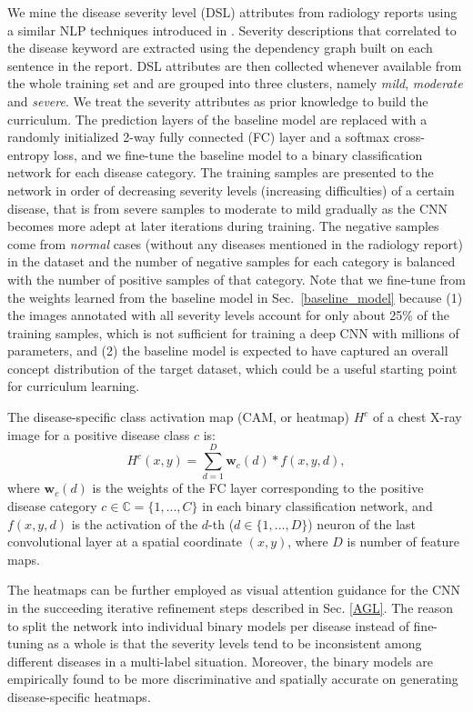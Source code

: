 \documentclass[runningheads,a4paper]{llncs}
\begin{document}
We mine the disease severity level (DSL) attributes from radiology reports using a similar NLP techniques introduced in \cite{Wang_CVPR2017}. Severity descriptions that correlated to the disease keyword are extracted using the dependency graph built on each sentence in the report. DSL attributes are then collected whenever available from the whole training set and are grouped into three clusters, namely \textit{mild}, \textit{moderate} and \textit{severe}. We treat the severity attributes as prior knowledge to build the curriculum. The prediction layers of the baseline model are replaced with a randomly initialized 2-way fully connected (FC) layer and a softmax cross-entropy loss, and we fine-tune the baseline model to a binary classification network for each disease category. The training samples are presented to the network in order of decreasing severity levels (increasing difficulties) of a certain disease, that is from severe samples to moderate to mild gradually as the CNN becomes more adept at later iterations during training. The negative samples come from \textit{normal} cases (without any diseases mentioned in the radiology report) in the dataset and the number of negative samples for each category is balanced with the number of positive samples of that category. Note that we fine-tune from the weights learned from the baseline model in Sec.~\ref{baseline_model} because (1) the images annotated with all severity levels account for only about 25\% of the training samples, which is not sufficient for training a deep CNN with millions of parameters, and (2) the baseline model is expected to have captured an overall concept distribution of the target dataset, which could be a useful starting point for curriculum learning.

The disease-specific class activation map \cite{Zhou_CVPR2016} (CAM, or heatmap) $H^{c}$ of a chest X-ray image for a positive disease class $c$ is:
\begin{equation}\label{eq:cam}
	H^{c}{(x, y)} = \sum_{d=1}^{D}\textbf{w}_{c}(d)*f(x, y, d),
\end{equation}
\noindent where $\textbf{w}_{c}(d)$ is the weights of the FC layer corresponding to the positive disease category $c\in \mathbb{C} = \{1, ..., C\}$ in each binary classification network, and $f(x, y, d)$ is the activation of the $d$-th ($d \in \{1, ..., D\}$) neuron of the last convolutional layer at a spatial coordinate $(x, y)$, where $D$ is number of feature maps.

The heatmaps can be further employed as visual attention guidance for the CNN in the succeeding iterative refinement steps described in Sec. \ref{AGL}. 
The reason to split the network into individual binary models per disease instead of fine-tuning as a whole is that the severity levels tend to be inconsistent among different diseases in a multi-label situation. Moreover, the binary models are empirically found to be more discriminative and spatially accurate on generating disease-specific heatmaps. 
\end{document}
